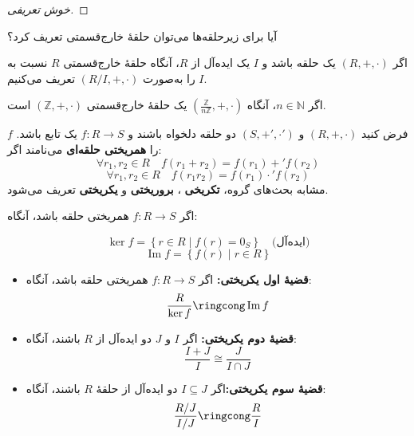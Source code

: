 \begin{proof}[خوش تعریفی]

\end{proof}

\begin{remark}
    آیا برای زیرحلقه‌ها می‌توان حلقهٔ خارج‌قسمتی تعریف کرد؟
\end{remark}

\begin{definition}
    اگر $(R, +, \cdot)$ یک حلقه باشد و $I$ یک ایده‌آل از $R$، آنگاه حلقهٔ خارج‌قسمتی $R$ نسبت به $I$ را به‌صورت $(R/I, +, \cdot)$ تعریف می‌کنیم.

\end{definition}



\begin{example}
    اگر $n \in \mathbb{N}$، آنگاه $( \frac{\mathbb{Z}}{n\mathbb{Z}}, +, \cdot)$ یک حلقهٔ خارج‌قسمتی $( \mathbb{Z}, +, \cdot)$
    است.
\end{example}


\begin{definition}
    فرض کنید $(R,+,\cdot)$ و $(S,+',\cdot')$ دو حلقه دلخواه باشند و $f \colon R \to S$ یک تابع باشد. $f$ را \textbf{همریختی حلقه‌ای} می‌نامند اگر:
    \[
        \forall r_1, r_2 \in R \quad f(r_1 + r_2) = f(r_1) +' f(r_2)
    \]
    \[
        \forall r_1, r_2 \in R \quad f(r_1 r_2) = f(r_1) \cdot' f(r_2)
    \]
    مشابه بحث‌های گروه، \textbf{تکریخی} ، \textbf{بروریختی} و \textbf{یکریختی} تعریف می‌شود.
\end{definition}

\begin{definition}
    اگر $f \colon R \to S$ همریختی حلقه باشد، آنگاه:

    \[
        \ker f = \left\{ r \in R \mid f(r) = 0_S \right\} \quad \text{(ایده‌آل)}
    \]
    \[
        \operatorname{Im} f = \left\{ f(r) \mid r \in R \right\}
    \]
\end{definition}

\begin{theorem}
    \leavevmode
    \begin{itemize}
        \item \textbf{قضیهٔ اول یکریختی:} اگر $f \colon R \to S$ همریختی حلقه باشد، آنگاه:
              \[
                  \frac{R}{\ker f} \ringcong \operatorname{Im} f
              \]

        \item \textbf{قضیهٔ دوم یکریختی:}
              اگر $I $ و $J$ دو ایده‌آل از $R$ باشند، آنگاه:
              \[
                  \frac{I + J}{I} \cong \frac{J}{I \cap J}
              \]
        \item \textbf{قضیهٔ سوم یکریختی:}اگر $I \subseteq J$ دو ایده‌آل از حلقهٔ $R$ باشند، آنگاه:
              \[
                  \frac{R/J}{I/J} \ringcong \frac{R}{I}
              \]
    \end{itemize}


\end{theorem}



